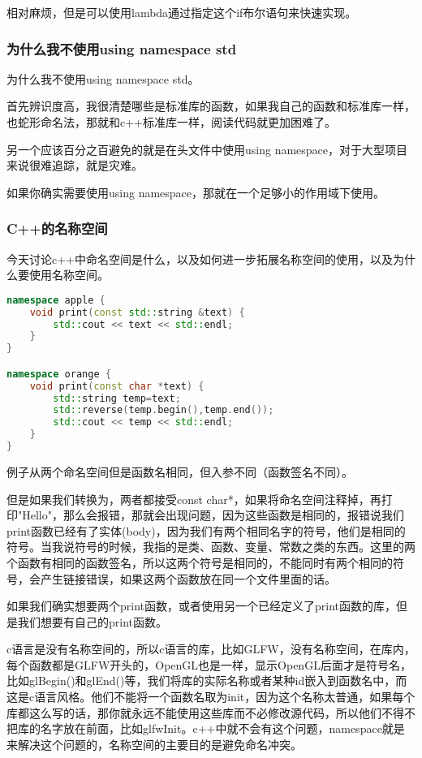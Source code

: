 相对麻烦，但是可以使用lambda通过指定这个{\ncodestyle if}布尔语句来快速实现。

\subsubsection{为什么我不使用using namespace std}

为什么我不使用{\ncodestyle using namespace std}。

首先辨识度高，我很清楚哪些是标准库的函数，如果我自己的函数和标准库一样，也蛇形命名法，那就和c++标准库一样，阅读代码就更加困难了。

另一个应该百分之百避免的就是在头文件中使用{\ncodestyle using namespace}，对于大型项目来说很难追踪，就是灾难。

如果你确实需要使用{\ncodestyle using namespace}，那就在一个足够小的作用域下使用。
\subsubsection{C++的名称空间}

今天讨论c++中命名空间是什么，以及如何进一步拓展名称空间的使用，以及为什么要使用名称空间。

\begin{lstlisting}[language=c++]
namespace apple {
    void print(const std::string &text) {
        std::cout << text << std::endl;
    }
}

namespace orange {
    void print(const char *text) {
        std::string temp=text;
        std::reverse(temp.begin(),temp.end());
        std::cout << temp << std::endl;
    }
}
\end{lstlisting}
例子从两个命名空间但是函数名相同，但入参不同（函数签名不同）。

但是如果我们转换为，两者都接受{\ncodestyle const char*}，如果将命名空间注释掉，再打印{\ncodestyle "Hello"}，那么会报错，那就会出现问题，因为这些函数是相同的，报错说我们{\ncodestyle print}函数已经有了实体(body)，因为我们有两个相同名字的符号，他们是相同的符号。当我说符号的时候，我指的是类、函数、变量、常数之类的东西。这里的两个函数有相同的函数签名，所以这两个符号是相同的，不能同时有两个相同的符号，会产生链接错误，如果这两个函数放在同一个文件里面的话。

如果我们确实想要两个{\ncodestyle print}函数，或者使用另一个已经定义了{\ncodestyle print}函数的库，但是我们想要有自己的{\ncodestyle print}函数。

c语言是没有名称空间的，所以c语言的库，比如GLFW，没有名称空间，在库内，每个函数都是GLFW开头的，OpenGL也是一样，显示OpenGL后面才是符号名，比如{\ncodestyle glBegin()}和{\ncodestyle glEnd()}等，我们将库的实际名称或者某种id嵌入到函数名中，而这是c语言风格。他们不能将一个函数名取为init，因为这个名称太普通，如果每个库都这么写的话，那你就永远不能使用这些库而不必修改源代码，所以他们不得不把库的名字放在前面，比如glfwInit。c++中就不会有这个问题，namespace就是来解决这个问题的，名称空间的主要目的是避免命名冲突。


